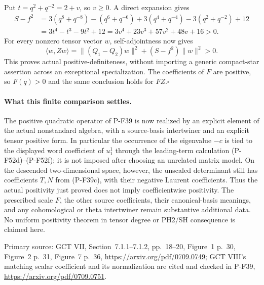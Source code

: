 \documentclass[11pt,a4paper]{article}
\begin{document}
Put $t=q^2+q^{-2}=2+v$, so $v\ge0$. A direct expansion gives
\[
 \begin{split}
 S-f^2
 &=3(q^8+q^{-8})-(q^6+q^{-6})
       +3(q^4+q^{-4})-3(q^2+q^{-2})+12\\
 &=3t^4-t^3-9t^2+12
   =3v^4+23v^3+57v^2+48v+16>0.
 \end{split}                                                    \tag{P-F52l}
\]
For every nonzero tensor vector $w$, self-adjointness now gives
\[
 \langle w,Zw\rangle
   =\|(Q_1-Q_2)w\|^2+(S-f^2)\|w\|^2>0.
\]
This proves actual positive-definiteness, without importing a
generic compact-star assertion across an exceptional specialization.
The coefficients of $F$ are positive, so $F(q)>0$ and the same
conclusion holds for $FZ$.\hfill$\square$

\paragraph{What this finite comparison settles.}
The positive quadratic operator of P-F39 is now realized by an
explicit element of the actual nonstandard algebra, with a
source-basis intertwiner and an explicit tensor positive form.
In particular the occurrence of the eigenvalue $-c$ is tied to
the displayed word coefficient of $u_1^1$ through the leading-term
calculation (P-F52d)--(P-F52f); it is not imposed after choosing an
unrelated matrix model. On the descended two-dimensional space,
however, the unscaled determinant still has coefficients $T,N$
from (P-F39c), with their negative Laurent coefficients. Thus the
actual positivity just proved does not imply coefficientwise
positivity. The prescribed scale $F$, the other source coefficients,
their canonical-basis meanings, and any cohomological or theta
intertwiner remain substantive additional data. No uniform positivity
theorem in tensor degree or PH2/SH consequence is claimed here.

Primary source: GCT VII, Section~7.1.1--7.1.2, pp.~18--20,
Figure~1 p.~30, Figure~2 p.~31, Figure~7 p.~36,
\url{https://arxiv.org/pdf/0709.0749}; GCT VIII's matching scalar
coefficient and its normalization are cited and checked in P-F39,
\url{https://arxiv.org/pdf/0709.0751}.
\end{document}
